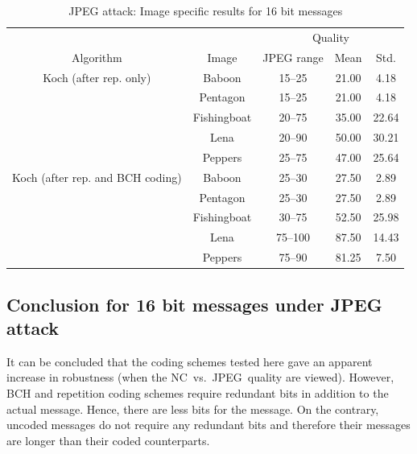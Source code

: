 \documentclass[12pt]{report}
\begin{document}
\begin{table}[htb]
\begin{scriptsize}
        \begin{center}
                \begin{tabular}{|c|c|c|c|c|} \hline
					& 		& \multicolumn{3}{c|}{Quality} \\ \cline{3-5}
                Algorithm       	& Image         & JPEG range  			& Mean          & Std.  \\ \hline\hline
                Koch (after rep. only)  & Baboon        & 15--25                 	& 21.00         & 4.18  \\ \cline{2-5}
                			& Pentagon      & 15--25                 	& 21.00         & 4.18  \\ \cline{2-5}
                			& Fishingboat   & 20--75                 	& 35.00         & 22.64  \\ \cline{2-5}
                			& Lena          & 20--90                	& 50.00         & 30.21  \\ \cline{2-5}
                			& Peppers       & 25--75                	& 47.00         & 25.64  \\ \hline\hline

                Koch (after rep. and BCH coding)  & Baboon      & 25--30                 & 27.50         & 2.89  \\ \cline{2-5} 
                				& Pentagon      & 25--30                 & 27.50         & 2.89  \\ \cline{2-5} 
                				& Fishingboat   & 30--75                 & 52.50         & 25.98 \\ \cline{2-5} 
                				& Lena          & 75--100                & 87.50         & 14.43  \\ \cline{2-5} 
                				& Peppers       & 75--90              	& 81.25         & 7.50  \\ \hline
        \end{tabular}
        \caption{JPEG attack: Image specific results for 16 bit messages} 
        \label{tab:imgSpecificBK}
        \end{center}
\end{scriptsize}
\end{table}
\normalsize


\subsection{Conclusion for 16 bit messages under JPEG attack}
\label{sec:jpeg16resultsConcBK}
It can be concluded that the coding schemes tested here gave an apparent increase in robustness (when the
NC~vs.~JPEG~quality are viewed). However, BCH and repetition coding schemes require redundant bits in addition
to the actual message. Hence, there are less bits for the message. On the contrary, uncoded messages do not
require any redundant bits and therefore their messages are longer than their coded counterparts.
\end{document}
